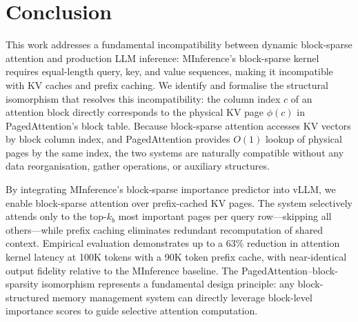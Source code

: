 \documentclass{article}
\begin{document}
\section{Conclusion}
\label{sec:conclusion}

This work addresses a fundamental incompatibility between dynamic
block-sparse attention and production LLM inference: MInference's
block-sparse kernel requires equal-length query, key, and value sequences,
making it incompatible with KV caches and prefix caching. We identify and
formalise the structural isomorphism that resolves this incompatibility:
the column index $c$ of an attention block directly corresponds to the
physical KV page $\phi(c)$ in PagedAttention's block table. Because
block-sparse attention accesses KV vectors by block column index, and
PagedAttention provides $O(1)$ lookup of physical pages by the same index,
the two systems are naturally compatible without any data reorganisation,
gather operations, or auxiliary structures.

By integrating MInference's block-sparse importance predictor into vLLM,
we enable block-sparse attention over prefix-cached KV pages. The system selectively attends only to the top-$k_b$ most important
pages per query row---skipping all others---while prefix caching eliminates
redundant recomputation of shared context. Empirical evaluation demonstrates
up to a 63\% reduction in attention kernel latency at 100K tokens with a
90K token prefix cache, with near-identical output fidelity relative to the
MInference baseline. The PagedAttention--block-sparsity isomorphism
represents a fundamental design principle: any block-structured memory
management system can directly leverage block-level importance scores to
guide selective attention computation.



\end{document}
